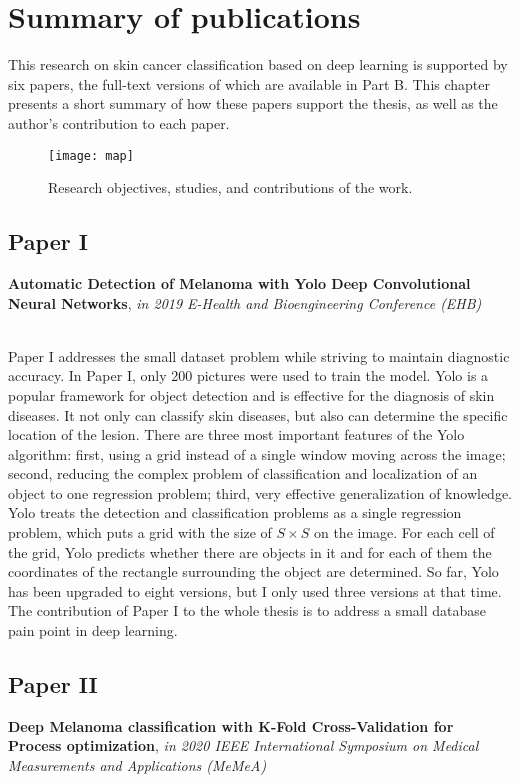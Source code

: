 
\chapter{Summary of publications} \label{ch:method}
This research on skin cancer classification based on deep learning is supported by six papers, the full-text versions of which are available in Part B. This chapter presents a short summary of how these papers support the thesis, as well as the author's contribution to each paper.

\begin{figure}[!h]
\centering
	\texttt{[image: map]}
		\caption{Research objectives, studies, and contributions of the work.}
		\label{Fig:paper} 
\end{figure}

\section*{Paper I}
\textbf{Automatic Detection of Melanoma with Yolo Deep Convolutional Neural Networks}, \textit{in 2019 E-Health and Bioengineering Conference (EHB)}



~\\

Paper I addresses the small dataset problem while striving to maintain diagnostic accuracy. In Paper I, only 200 pictures were used to train the model. Yolo is a popular framework for object detection and is effective for the diagnosis of skin diseases. It not only can classify skin diseases, but also can determine the specific location of the lesion. There are three most important features of the Yolo algorithm: first, using a grid instead of a single window moving across the image; second, reducing the complex problem of classification and localization of an object to one regression problem; third, very effective generalization of knowledge. Yolo treats the detection and classification problems as a single regression problem, which puts a grid with the size of $S \times S$ on the image. For each cell of the grid, Yolo predicts whether there are objects in it and for each of them the coordinates of the rectangle surrounding the object are determined. So far, Yolo has been upgraded to eight versions, but I only used three versions at that time. The contribution of Paper I to the whole thesis is to address a small database pain point in deep learning. 

\section*{Paper II}
\textbf{Deep Melanoma classification with K-Fold Cross-Validation for Process optimization}, \textit{in 2020 IEEE International Symposium on Medical Measurements and Applications (MeMeA)}



